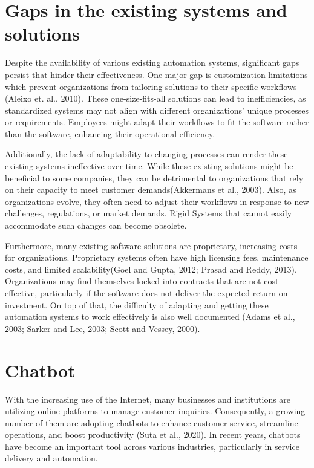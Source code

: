 \section{Gaps in the  existing systems and solutions}

Despite the availability of various existing automation systems, significant gaps persist that hinder their effectiveness. One major gap is customization limitations which prevent organizations from tailoring solutions to their specific workflows (Aleixo et. al., 2010). These one-size-fits-all solutions can lead to inefficiencies, as standardized systems may not align with different organizations' unique processes or requirements. Employees might adapt their workflows to fit the software rather than the software, enhancing their operational efficiency. 

Additionally, the lack of adaptability to changing processes can render these existing systems ineffective over time. While these existing solutions might be beneficial to some companies, they can be detrimental to organizations that rely on their capacity to meet customer demands(Akkermans et al., 2003). Also, as organizations evolve, they often need to adjust their workflows in response to new challenges, regulations, or market demands. Rigid Systems that cannot easily accommodate such changes can become obsolete. 

Furthermore, many existing software solutions are proprietary, increasing costs for organizations. Proprietary systems often have high licensing fees, maintenance costs, and limited scalability(Goel and Gupta, 2012; Prasad and Reddy, 2013). Organizations may find themselves locked into contracts that are not cost-effective, particularly if the software does not deliver the expected return on investment. On top of that, the difficulty of adapting and getting these automation systems to work effectively is also well documented (Adams et al., 2003; Sarker and Lee, 2003; Scott and Vessey, 2000).


\section{Chatbot}
With the increasing use of the Internet, many businesses and institutions are utilizing online platforms to manage customer inquiries. Consequently, a growing number of them are adopting chatbots to enhance customer service, streamline operations, and boost productivity (Suta et al., 2020). In recent years, chatbots have become an important tool across various industries, particularly in service delivery and automation.

